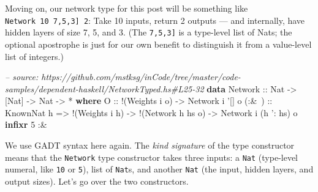 \documentclass[]{article}
\newenvironment{Shaded}{\begin{snugshade}}{\end{snugshade}}
\newcommand{\CharTok}[1]{\textcolor[rgb]{0.31,0.60,0.02}{#1}}
\newcommand{\CommentTok}[1]{\textcolor[rgb]{0.56,0.35,0.01}{\textit{#1}}}
\newcommand{\DataTypeTok}[1]{\textcolor[rgb]{0.13,0.29,0.53}{#1}}
\newcommand{\DecValTok}[1]{\textcolor[rgb]{0.00,0.00,0.81}{#1}}
\newcommand{\FunctionTok}[1]{\textcolor[rgb]{0.00,0.00,0.00}{#1}}
\newcommand{\KeywordTok}[1]{\textcolor[rgb]{0.13,0.29,0.53}{\textbf{#1}}}
\newcommand{\NormalTok}[1]{#1}
\newcommand{\OtherTok}[1]{\textcolor[rgb]{0.56,0.35,0.01}{#1}}
\begin{document}
Moving on, our network type for this post will be something like
\texttt{Network\ 10\ \textquotesingle{}{[}7,5,3{]}\ 2}: Take 10 inputs, return 2
outputs --- and internally, have hidden layers of size 7, 5, and 3. (The
\texttt{\textquotesingle{}{[}7,5,3{]}} is a type-level list of Nats; the
optional \texttt{\textquotesingle{}} apostrophe is just for our own benefit to
distinguish it from a value-level list of integers.)

\begin{Shaded}
\begin{Highlighting}[]
\CommentTok{-- source: https://github.com/mstksg/inCode/tree/master/code-samples/dependent-haskell/NetworkTyped.hs#L25-32}
\KeywordTok{data} \DataTypeTok{Network}\OtherTok{ ::} \DataTypeTok{Nat} \OtherTok{->}\NormalTok{ [}\DataTypeTok{Nat}\NormalTok{] }\OtherTok{->} \DataTypeTok{Nat} \OtherTok{->} \FunctionTok{*} \KeywordTok{where}
    \DataTypeTok{O}\OtherTok{     ::} \FunctionTok{!}\NormalTok{(}\DataTypeTok{Weights}\NormalTok{ i o)}
          \OtherTok{->} \DataTypeTok{Network}\NormalTok{ i }\CharTok{'[] o}
\OtherTok{    (:&~) ::} \DataTypeTok{KnownNat}\NormalTok{ h}
          \OtherTok{=>} \FunctionTok{!}\NormalTok{(}\DataTypeTok{Weights}\NormalTok{ i h)}
          \OtherTok{->} \FunctionTok{!}\NormalTok{(}\DataTypeTok{Network}\NormalTok{ h hs o)}
          \OtherTok{->} \DataTypeTok{Network}\NormalTok{ i (h }\CharTok{': hs) o}
\KeywordTok{infixr} \DecValTok{5} \FunctionTok{:&~}
\end{Highlighting}
\end{Shaded}

We use GADT syntax here again. The \emph{kind signature} of the type constructor
means that the \texttt{Network} type constructor takes three inputs: a
\texttt{Nat} (type-level numeral, like \texttt{10} or \texttt{5}), list of
\texttt{Nat}s, and another \texttt{Nat} (the input, hidden layers, and output
sizes). Let's go over the two constructors.
\end{document}
